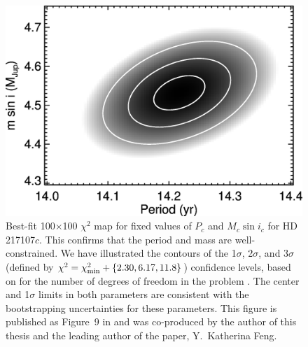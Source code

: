\newpage

\begin{figure}
\includegraphics[scale=0.6]{boottran/feng2015-f9-217107.eps} 
\caption{Best-fit 100$\times$100 $\chi^2$ map for fixed values of $P_c$ and
  $M_c\sin{i_c}$ for HD 217107$c$. This confirms that the period and
  mass are well-constrained.  We have illustrated the contours of the
  1$\sigma$, 2$\sigma$, and 3$\sigma$ (defined by $\chi^2 =
  \chi^2_{\rm min} + \{2.30, 6.17, 11.8\}$) confidence levels, based on
  for the number of degrees of freedom in the problem
  \citep{2002nrca.book.....P}. The center and 1$\sigma$ limits in both
  parameters are consistent with the bootstrapping uncertainties for
  these parameters. This figure is published as Figure~9 in
  \cite{2015ApJ...800...22F} and was co-produced by the author of this
  thesis and the leading author of the paper, Y.\ Katherina Feng.
\label{boottran:mmperplot}}
\end{figure}


